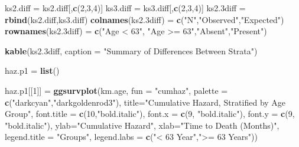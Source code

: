 \documentclass[
]{article}
\newenvironment{Shaded}{\begin{snugshade}}{\end{snugshade}}
\newcommand{\DataTypeTok}[1]{\textcolor[rgb]{0.13,0.29,0.53}{#1}}
\newcommand{\DecValTok}[1]{\textcolor[rgb]{0.00,0.00,0.81}{#1}}
\newcommand{\FloatTok}[1]{\textcolor[rgb]{0.00,0.00,0.81}{#1}}
\newcommand{\KeywordTok}[1]{\textcolor[rgb]{0.13,0.29,0.53}{\textbf{#1}}}
\newcommand{\NormalTok}[1]{#1}
\newcommand{\StringTok}[1]{\textcolor[rgb]{0.31,0.60,0.02}{#1}}
\begin{document}
\begin{Shaded}
\begin{Highlighting}[]
{{{\NormalTok{ks2.diff =}\StringTok{ }\NormalTok{ks2.diff[,}\KeywordTok{c}\NormalTok{(}\DecValTok{2}\NormalTok{,}\DecValTok{3}\NormalTok{,}\DecValTok{4}\NormalTok{)]}
\NormalTok{ks3.diff =}\StringTok{ }\NormalTok{ks3.diff[,}\KeywordTok{c}\NormalTok{(}\DecValTok{2}\NormalTok{,}\DecValTok{3}\NormalTok{,}\DecValTok{4}\NormalTok{)]}
\NormalTok{ks2}\FloatTok{.3}\NormalTok{diff =}\StringTok{ }\KeywordTok{rbind}\NormalTok{(ks2.diff,ks3.diff)}
\KeywordTok{colnames}\NormalTok{(ks2}\FloatTok{.3}\NormalTok{diff) =}\StringTok{ }\KeywordTok{c}\NormalTok{(}\StringTok{"N"}\NormalTok{,}\StringTok{"Observed"}\NormalTok{,}\StringTok{"Expected"}\NormalTok{)}
\KeywordTok{rownames}\NormalTok{(ks2}\FloatTok{.3}\NormalTok{diff) =}\StringTok{ }\KeywordTok{c}\NormalTok{(}\StringTok{"Age < 63"}\NormalTok{, }\StringTok{"Age >= 63"}\NormalTok{,}\StringTok{"Absent"}\NormalTok{,}\StringTok{"Present"}\NormalTok{)}

\KeywordTok{kable}\NormalTok{(ks2}\FloatTok{.3}\NormalTok{diff, }\DataTypeTok{caption =} \StringTok{"Summary of Differences Between Strata"}\NormalTok{)}

\NormalTok{haz.p1 =}\StringTok{ }\KeywordTok{list}\NormalTok{()}

\NormalTok{haz.p1[[}\DecValTok{1}\NormalTok{]] =}\StringTok{ }\KeywordTok{ggsurvplot}\NormalTok{(km.age, }
           \DataTypeTok{fun =} \StringTok{"cumhaz"}\NormalTok{,}
           \DataTypeTok{palette =} \KeywordTok{c}\NormalTok{(}\StringTok{"darkcyan"}\NormalTok{,}\StringTok{"darkgoldenrod3"}\NormalTok{), }
           \DataTypeTok{title=}\StringTok{"Cumulative Hazard, Stratified by Age Group"}\NormalTok{,}
           \DataTypeTok{font.title =} \KeywordTok{c}\NormalTok{(}\DecValTok{10}\NormalTok{,}\StringTok{"bold.italic"}\NormalTok{),}
           \DataTypeTok{font.x =} \KeywordTok{c}\NormalTok{(}\DecValTok{9}\NormalTok{, }\StringTok{"bold.italic"}\NormalTok{),}
           \DataTypeTok{font.y =} \KeywordTok{c}\NormalTok{(}\DecValTok{9}\NormalTok{, }\StringTok{"bold.italic"}\NormalTok{),}
           \DataTypeTok{ylab=}\StringTok{"Cumulative Hazard"}\NormalTok{, }
           \DataTypeTok{xlab=}\StringTok{"Time to Death (Months)"}\NormalTok{,}
           \DataTypeTok{legend.title =} \StringTok{"Groups"}\NormalTok{,}
           \DataTypeTok{legend.labs =} \KeywordTok{c}\NormalTok{(}\StringTok{"< 63 Year"}\NormalTok{,}\StringTok{">= 63 Years"}\NormalTok{))}

}}}
\end{Highlighting}
\end{Shaded}
\end{document}
